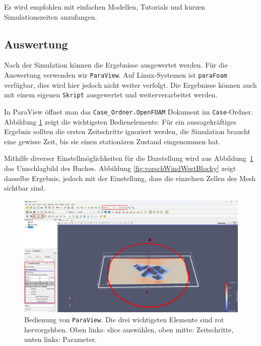 Es wird empfohlen mit einfachen Modellen, Tutorials und kurzen Simulationszeiten anzufangen.

\subsection{Auswertung \label{openfoam:section:Auswertung}}
Nach der Simulation können die Ergebnisse ausgewertet werden. 
Für die Auswertung verwenden wir \texttt{ParaView}. 
Auf Linux-Systemen ist \texttt{paraFoam} verfügbar, dies wird hier jedoch nicht weiter verfolgt.
Die Ergebnisse können auch mit einem eigenen \texttt{Skript} ausgewertet und weiterverarbeitet werden.

In ParaView öffnet man das \texttt{Case\_Ordner.OpenFOAM} Dokument im \texttt{Case}-Ordner.
Abbildung \ref{fig:Beispiel_Paraview} zeigt die wichtigsten Bedienelemente.
Für ein aussagekräftiges Ergebnis sollten die ersten Zeitschritte ignoriert werden, die Simulation braucht eine gewisse Zeit, bis sie einen stationären Zustand eingenommen hat.

Mithilfe diverser Einstellmöglichkeiten für die Darstellung wird aus Abbildung~\ref{fig:Beispiel_Paraview} das Umschlagbild des Buches.
Abbildung \ref{fig:vorschWindWestBlocky} zeigt dasselbe Ergebnis, jedoch mit der Einstellung, dass die einzelnen Zellen des Mesh sichtbar sind.

\begin{figure}
    \centering
    \includegraphics[width=1\textwidth]{papers/openfoam/Bilder/Beispiel_Paraview.png}
    \caption{Bedienung von \texttt{ParaView}. Die drei wichtigsten Elemente
sind rot hervorgehben.
Oben links: slice auswählen, oben mitte: Zeitschritte, unten links: Parameter.}
    \label{fig:Beispiel_Paraview}
\end{figure}

